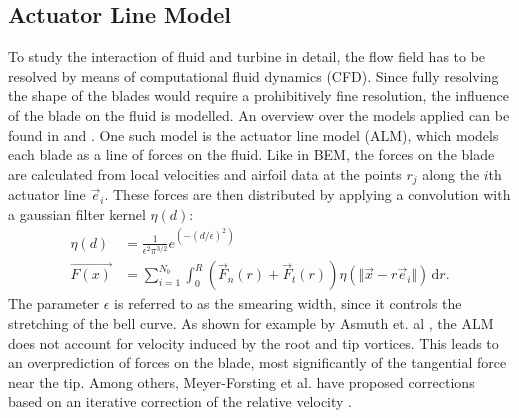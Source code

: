 \subsection{Actuator Line Model}
To study the interaction of fluid and turbine in detail, the flow field has to be resolved by means of computational fluid dynamics (CFD). Since fully resolving the shape of the blades would require a prohibitively fine resolution, the influence of the blade on the fluid is modelled. An overview over the models applied can be found in \cite{breton_survey_2017} and \cite{kheirabadi_quantitative_2019}. One such model is the actuator line model (ALM), which models each blade as a line of forces on the fluid. Like in BEM, the forces on the blade are calculated from local velocities and airfoil data at the points $r_j$ along the $i$th actuator line $\vec{e}_i$. These forces are then distributed by applying a convolution with a gaussian filter kernel $\eta(d)$:
\begin{align}
	\eta(d) &= \frac{1}{\epsilon^2 \pi^{3/2}} e^{(-(d/\epsilon)^2)} \label{eq:gauss_alm} \\
	\vec{F(x)} &= \sum_{i=1}^{N_b} \int_{0}^{R} \left(\vec{F}_n(r)+ \vec{F}_t(r) \right) \eta(\Vert \vec{x} - r\vec{e}_i\Vert)\, \mathrm{d}r. \label{eq:ALM}
\end{align} The parameter $\epsilon$ is referred to as the smearing width, since it controls the stretching of the bell curve. As shown for example by Asmuth et. al \cite{asmuth_actuator_2019}, the ALM does not account for velocity induced by the root and tip vortices. This leads to an overprediction of forces on the blade, most significantly of the tangential force near the tip. Among others, Meyer-Forsting et al. have proposed corrections  based on an iterative correction of the relative velocity \cite{meyer_forsting_vortex-based_2019}. \cite{sorensen_numerical_2002}
